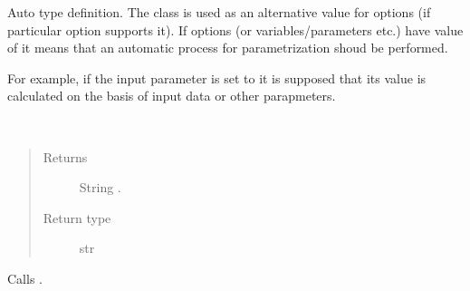 \documentclass[a4paper,10pt,english]{sphinxmanual}
\begin{document}

\begin{fulllineitems}
\label{aqueduct.utils.helpers:aqueduct.utils.helpers.Auto}
Auto type definition.
The class is used as an alternative value for options (if particular option supports it).
If options (or variables/parameters etc.) have value of {\hyperref[aqueduct.utils.helpers:aqueduct.utils.helpers.Auto]{}} it means that an automatic
process for parametrization shoud be performed.

For example, if the input parameter is set to {\hyperref[aqueduct.utils.helpers:aqueduct.utils.helpers.Auto]{}} it is supposed that its value is calculated
on the basis of input data or other parapmeters.

\begin{fulllineitems}
\label{aqueduct.utils.helpers:aqueduct.utils.helpers.Auto.__repr__}~\begin{quote}\begin{description}
\item[{Returns}] \leavevmode
String .

\item[{Return type}] \leavevmode
str

\end{description}\end{quote}

\end{fulllineitems}


\begin{fulllineitems}
\label{aqueduct.utils.helpers:aqueduct.utils.helpers.Auto.__str__}
Calls {\hyperref[aqueduct.utils.helpers:aqueduct.utils.helpers.Auto.__repr__]{}}.

\end{fulllineitems}


\end{fulllineitems}

\end{document}
